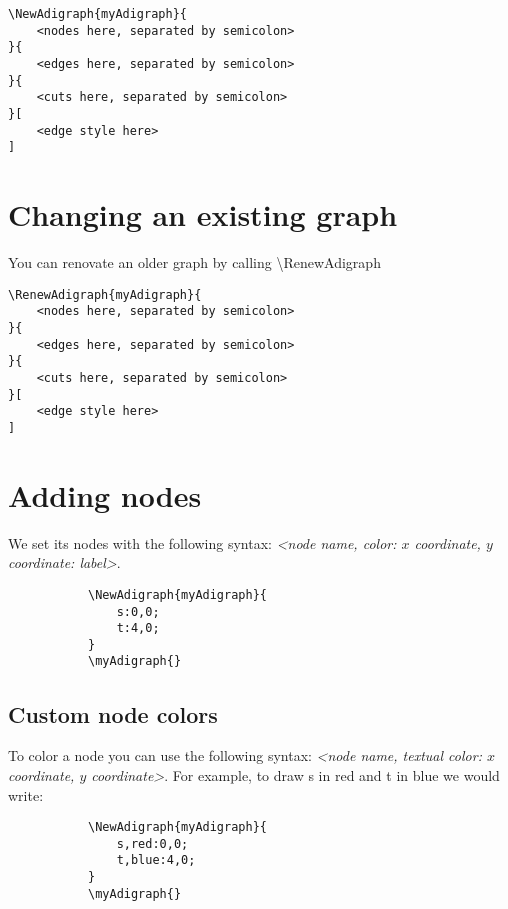 \documentclass{report}
\begin{document}
\begin{verbatim}
\NewAdigraph{myAdigraph}{
	<nodes here, separated by semicolon>
}{
	<edges here, separated by semicolon>
}{
	<cuts here, separated by semicolon>
}[
	<edge style here>
]
\end{verbatim}

\section{Changing an existing graph}
You can renovate an older graph by calling \textbackslash RenewAdigraph

\begin{verbatim}
\RenewAdigraph{myAdigraph}{
	<nodes here, separated by semicolon>
}{
	<edges here, separated by semicolon>
}{
	<cuts here, separated by semicolon>
}[
	<edge style here>
]
\end{verbatim}

\section{Adding nodes}
We set its nodes with the following syntax: \textit{<node name, color: \(x\) coordinate, \(y\) coordinate: label>}.

\begin{figure}
	\begin{subfigure}{0.49\textwidth}
		\begin{verbatim}
\NewAdigraph{myAdigraph}{
 	s:0,0;
 	t:4,0;
}
\myAdigraph{}
\end{verbatim}
	\end{subfigure}
	\begin{subfigure}{0.49\textwidth}
		\myAdigraph{}
	\end{subfigure}
\end{figure}

\subsection{Custom node colors}
To color a node you can use the following syntax: \textit{<node name, textual color: \(x\) coordinate, \(y\) coordinate>}. For example, to draw s in red and t in blue we would write:

\begin{figure}
	\begin{subfigure}{0.49\textwidth}
		\begin{verbatim}
\NewAdigraph{myAdigraph}{
 	s,red:0,0;
 	t,blue:4,0;
}
\myAdigraph{}
\end{verbatim}
	\end{subfigure}
	\begin{subfigure}{0.49\textwidth}
		\myAdigraph{}
	\end{subfigure}
\end{figure}
\end{document}
